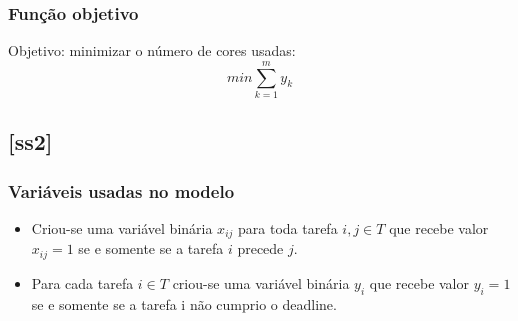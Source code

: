 \documentclass[11pt,letterpaper]{article}
\begin{document}
\subsubsection*{Função objetivo}
Objetivo: minimizar o número de cores usadas:
\begin{equation}
min\sum_{k=1}^{m}y_k
\end{equation}


\subsection{{[}ss2{]}}
\subsubsection*{Variáveis usadas no modelo}
\begin{itemize}
\item Criou-se uma variável binária $x_{ij}$ para toda tarefa $i, j
  \in T$ que recebe valor $x_{ij}=1$ se e somente se a
tarefa $i$ precede $j$.

\item Para cada tarefa $i \in T$ criou-se uma variável binária $y_{i}$
  que recebe valor $y_{i}=1$ se e somente se a tarefa i não cumprio o deadline.
\end{itemize}
\end{document}
